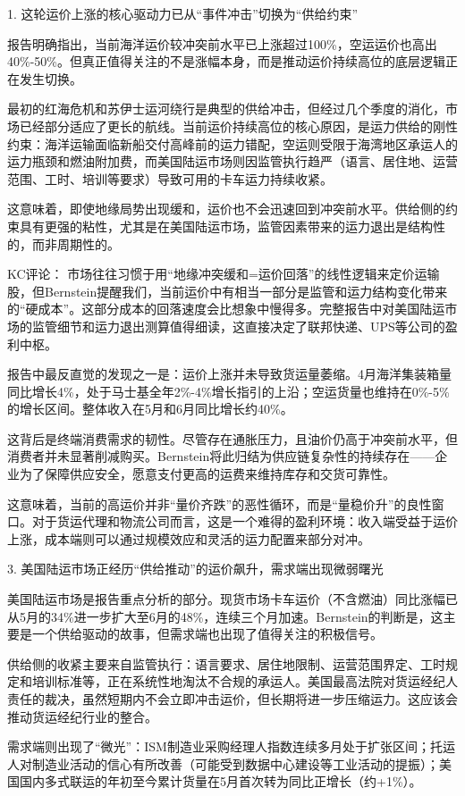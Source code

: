 \documentclass[11pt]{ctexart}
\begin{document}
1. 这轮运价上涨的核心驱动力已从“事件冲击”切换为“供给约束”

报告明确指出，当前海洋运价较冲突前水平已上涨超过100\%，空运运价也高出40\%-50\%。但真正值得关注的不是涨幅本身，而是推动运价持续高位的底层逻辑正在发生切换。

最初的红海危机和苏伊士运河绕行是典型的供给冲击，但经过几个季度的消化，市场已经部分适应了更长的航线。当前运价持续高位的核心原因，是运力供给的刚性约束：海洋运输面临新船交付高峰前的运力错配，空运则受限于海湾地区承运人的运力瓶颈和燃油附加费，而美国陆运市场则因监管执行趋严（语言、居住地、运营范围、工时、培训等要求）导致可用的卡车运力持续收紧。

这意味着，即使地缘局势出现缓和，运价也不会迅速回到冲突前水平。供给侧的约束具有更强的粘性，尤其是在美国陆运市场，监管因素带来的运力退出是结构性的，而非周期性的。

KC评论： 市场往往习惯于用“地缘冲突缓和=运价回落”的线性逻辑来定价运输股，但Bernstein提醒我们，当前运价中有相当一部分是监管和运力结构变化带来的“硬成本”。这部分成本的回落速度会比想象中慢得多。完整报告中对美国陆运市场的监管细节和运力退出测算值得细读，这直接决定了联邦快递、UPS等公司的盈利中枢。

报告中最反直觉的发现之一是：运价上涨并未导致货运量萎缩。4月海洋集装箱量同比增长4\%，处于马士基全年2\%-4\%增长指引的上沿；空运货量也维持在0\%-5\%的增长区间。整体收入在5月和6月同比增长约40\%。

这背后是终端消费需求的韧性。尽管存在通胀压力，且油价仍高于冲突前水平，但消费者并未显著削减购买。Bernstein将此归结为供应链复杂性的持续存在——企业为了保障供应安全，愿意支付更高的运费来维持库存和交货可靠性。

这意味着，当前的高运价并非“量价齐跌”的恶性循环，而是“量稳价升”的良性窗口。对于货运代理和物流公司而言，这是一个难得的盈利环境：收入端受益于运价上涨，成本端则可以通过规模效应和灵活的运力配置来部分对冲。

3. 美国陆运市场正经历“供给推动”的运价飙升，需求端出现微弱曙光

美国陆运市场是报告重点分析的部分。现货市场卡车运价（不含燃油）同比涨幅已从5月的34\%进一步扩大至6月的48\%，连续三个月加速。Bernstein的判断是，这主要是一个供给驱动的故事，但需求端也出现了值得关注的积极信号。

供给侧的收紧主要来自监管执行：语言要求、居住地限制、运营范围界定、工时规定和培训标准等，正在系统性地淘汰不合规的承运人。美国最高法院对货运经纪人责任的裁决，虽然短期内不会立即冲击运价，但长期将进一步压缩运力。这应该会推动货运经纪行业的整合。

需求端则出现了“微光”：ISM制造业采购经理人指数连续多月处于扩张区间；托运人对制造业活动的信心有所改善（可能受到数据中心建设等工业活动的提振）；美国国内多式联运的年初至今累计货量在5月首次转为同比正增长（约+1\%）。
\end{document}
